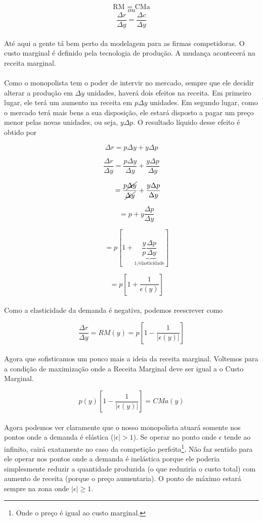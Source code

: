 \documentclass[a4paper,11pt,oneside]{book}
\theoremstyle{definition}
\theoremstyle{break}
\begin{document}
$$ \textrm{RM = CMa} $$
$$ ou $$
$$ \frac{\Delta r}{\Delta y} = \frac{\Delta c}{\Delta y} $$
\\
Até aqui a gente tá bem perto da modelagem para as firmas competidoras. O custo marginal é definido pela tecnologia de produção. A mudança acontecerá na receita marginal.
\\
\\
Como o monopolista tem o poder de intervir no mercado, sempre que ele decidir alterar a produção em $\Delta y$ unidades, haverá dois efeitos na receita. Em primeiro lugar, ele terá um aumento na receita em $p\Delta y$ unidades. Em segundo lugar, como o mercado terá mais bens a sua disposição, ele estará disposto a pagar um preço menor pelas novas unidades, ou seja, $y\Delta p$. O resultado líquido desse efeito é obtido por

$$\Delta r = p \Delta y + y \Delta p$$

$$ \frac{\Delta r}{\Delta y} = 
\frac{p \Delta y}{\Delta y} + 
\frac{y \Delta p}{\Delta y} $$

$$ \phantom{\frac{\Delta r}{\Delta y}} = 
\frac{p \cancel{\Delta y}}{\cancel{\Delta y}} + 
\frac{y \Delta p}{\Delta y} $$

$$ \phantom{\frac{\Delta r}{\Delta y}} = p + y\frac{\Delta p}{\Delta y} $$

$$ \phantom{\frac{\Delta r}{\Delta y}} = 
p \left[ 1 + \underbrace{\frac{y}{p}\frac{\Delta p}{\Delta y}}_\text{1/elasticidade} \right] $$

$$ \phantom{\frac{\Delta r}{\Delta y}} = 
p \left[ 1 + \frac{1}{\epsilon(y)} \right] $$
\\
Como a elasticidade da demanda é negativa, podemos reescrever como

$$ \frac{\Delta r}{\Delta y} = 
RM(y) =
p \left[ 1 - \frac{1}{|\epsilon(y)|} \right] $$
\\
Agora que sofisticamos um pouco mais a ideia da receita marginal. Voltemos para a condição de maximização onde a Receita Marginal deve ser igual a o Custo Marginal.

$$ p(y) \left[ 1 - \frac{1}{|\epsilon(y)|} \right] = CMa(y) $$
\\
Agora podemos ver claramente que o nosso monopolista atuará somente nos pontos onde a demanda é elástica ($|\epsilon| > 1$). Se operar no ponto onde $\epsilon$ tende ao infinito, cairá exatamente no caso da competição perfeita\footnote{Onde o preço é igual ao custo marginal.}. Não faz sentido para ele operar nos pontos onde a demanda é inelástica porque ele poderia simplesmente reduzir a quantidade produzida (o que reduziria o custo total) com aumento de receita (porque o preço aumentaria). O ponto de máximo estará sempre na zona onde $|\epsilon| \geq 1$.
\end{document}
